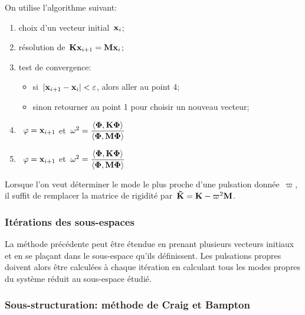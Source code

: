 On utilise l'algorithme suivant:
\begin{enumerate}
  \item choix d'un vecteur initial~$\VV{x}_i$;
  \item résolution de~$\MM{K}\VV{x}_{i+1} = \MM{M} \VV{x}_i$;
  \item test de convergence:
	\begin{itemize}
	  \item si~$|\VV{x}_{i+1}-\VV{x}_i|<\varepsilon$, alors aller au point 4;
	  \item sinon retourner au point 1 pour choisir un nouveau vecteur;
	\end{itemize}
   \ifVersionDuDocEstVincent
      \item~$\VV{\varphi}=\VV{x}_{i+1}$ et~$\omega^2=\dfrac{\langle \VV{\Phi}, \MM{K}\VV{\Phi}\rangle}{\langle \VV{\Phi}, \MM{M}\VV{\Phi}\rangle}$
   \else
     \item~$\VV{\varphi}=\VV{x}_{i+1}$ et~$\omega^2=\dfrac{\langle \boldsymbol{\Phi}, \MM{K}\boldsymbol{\Phi}\rangle}{\langle \boldsymbol{\Phi}, \MM{M}\boldsymbol{\Phi}\rangle}$
   \fi
\end{enumerate}
\medskipvm
Lorsque l'on veut déterminer le mode le plus proche d'une pulsation donnée~$\varpi$, il suffit de remplacer la matrice de rigidité par~$\MM{\tilde{K}}=\MM{K} - \varpi^2 \MM{M}$.
\medskipvm
{}

\medskip
\subsubsection{Itérations des sous-espaces}

La méthode précédente peut être étendue en prenant plusieurs vecteurs initiaux et en se plaçant dans le sous-espace qu'ils définissent. Les pulsations propres doivent alors être calculées à chaque itération en calculant tous les modes propres du système réduit au sous-espace étudié.

\medskip
\subsubsection{Sous-structuration: méthode de Craig et Bampton}

